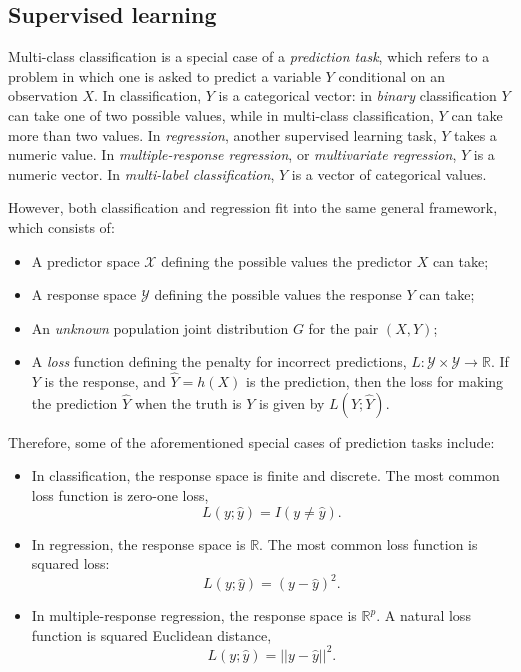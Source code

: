 \subsection{Supervised learning}

Multi-class classification is a special case of a \emph{prediction
  task}, which refers to a problem in which one is asked to predict a
variable $Y$ conditional on an observation $X$.  In classification,
$Y$ is a categorical vector: in \emph{binary} classification $Y$ can
take one of two possible values, while in multi-class classification,
$Y$ can take more than two values.  In \emph{regression}, another
supervised learning task, $Y$ takes a numeric value.  In
\emph{multiple-response regression}, or \emph{multivariate
  regression}, $Y$ is a numeric vector.  In \emph{multi-label
  classification}, $Y$ is a vector of categorical values.

However, both
classification and regression fit into the same general framework,
which consists of:

\begin{itemize}
\item A predictor space $\mathcal{X}$ defining the possible values the predictor $X$ can take;
\item A response space $\mathcal{Y}$ defining the possible values the response $Y$ can take;
\item An \emph{unknown} population joint distribution $G$ for the pair $(X, Y)$;
\item A \emph{loss} function defining the penalty for incorrect
  predictions, $L: \mathcal{Y} \times \mathcal{Y} \to \mathbb{R}$.  If
  $Y$ is the response, and $\hat{Y} = h(X)$ is the prediction, then
  the loss for making the prediction $\hat{Y}$ when the truth is $Y$
  is given by $L(Y; \hat{Y})$.
\end{itemize}

Therefore, some of the aforementioned special cases of prediction tasks include:

\begin{itemize}
\item In classification, the response space is finite and discrete.  The most common loss function is zero-one loss,
\[
L(y; \hat{y}) = I(y \neq \hat{y}).
\]
\item In regression, the response space is $\mathbb{R}$.  The most common loss function is squared loss:
\[
L(y; \hat{y}) = (y - \hat{y})^2.
\]
\item In multiple-response regression, the response space is $\mathbb{R}^p$.  A natural loss function is squared Euclidean distance,
\[
L(y; \hat{y}) = ||y - \hat{y}||^2.
\]
\end{itemize}

